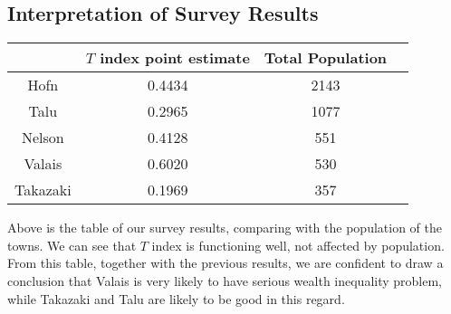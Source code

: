 \documentclass[12pt]{article}%
\begin{document}
\subsection{Interpretation of Survey Results}

\begin{center}
        \begin{tabular}{ | c | c | c | c |}
            \hline
                 & $T$ index point estimate 	& Total Population	  \\ 
            \hline
            Hofn 	& 0.4434		& 2143	 \\ 
            \hline 
            Talu & 0.2965 		& 1077	 \\ 
            \hline 
            Nelson & 0.4128 		& 551	 \\ 
            \hline 
            Valais & 0.6020 		& 530	 \\ 
            \hline 
            Takazaki & 0.1969 		& 357	 \\ 
            \hline
        \end{tabular}
\end{center}

Above is the table of our survey results, 
comparing with the population of the towns. 
We can see that $T$ index is functioning well, not affected by population.
From this table, together with the previous results, 
we are confident to draw a conclusion that Valais is very likely to  
have serious wealth inequality problem, 
while Takazaki and Talu are likely to be good in this regard.
\end{document}
